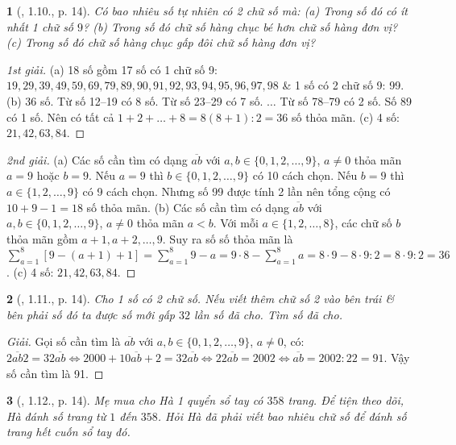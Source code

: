 \documentclass{article}
\newtheorem{baitoan}{}
\begin{document}
\begin{baitoan}[\cite{Binh_boi_duong_Toan_6_tap_1}, 1.10., p. 14]
	Có bao nhiêu số tự nhiên có 2 chữ số mà: (a) Trong số đó có ít nhất 1 chữ số $9$? (b) Trong số đó chữ số hàng chục bé hơn chữ số hàng đơn vị? (c) Trong số đó chữ số hàng chục gấp đôi chữ số hàng đơn vị?
\end{baitoan}

\begin{proof}[1st giải]
	(a) 18 số gồm 17 số có 1 chữ số 9: $19,29,39,49,59,69,79,89,90,91,92,93,94,95,96,97,98$ \& 1 số có 2 chữ số 9: 99. (b) 36 số. Từ số 12--19 có 8 số. Từ số 23--29 có 7 số. $\ldots$ Từ số 78--79 có 2 số. Số 89 có 1 số. Nên có tất cả $1 + 2 + \ldots + 8 = 8(8 + 1):2 = 36$ số thỏa mãn. (c) 4 số: $21,42,63,84$.
\end{proof}

\begin{proof}[2nd giải]
	(a) Các số cần tìm có dạng $\overline{ab}$ với $a,b\in\{0,1,2,\ldots,9\}$, $a\ne0$ thỏa mãn $a = 9$ hoặc $b = 9$. Nếu $a = 9$ thì $b\in\{0,1,2,\ldots,9\}$ có 10 cách chọn. Nếu $b = 9$ thì $a\in\{1,2,\ldots,9\}$ có 9 cách chọn. Nhưng số 99 được tính 2 lần nên tổng cộng có $10 + 9 - 1 = 18$ số thỏa mãn. (b) Các số cần tìm có dạng $\overline{ab}$ với $a,b\in\{0,1,2,\ldots,9\}$, $a\ne0$ thỏa mãn $a < b$. Với mỗi $a\in\{1,2,\ldots,8\}$, các chữ số $b$ thỏa mãn gồm $a + 1,a + 2,\ldots,9$. Suy ra số số thỏa mãn là $\sum_{a=1}^8 [9 - (a + 1) + 1] = \sum_{a=1}^8 9 - a = 9\cdot8 - \sum_{a=1}^8 a = 8\cdot9 - 8\cdot9:2 = 8\cdot9:2 = 36$. (c) 4 số: $21,42,63,84$.
\end{proof}

\begin{baitoan}[\cite{Binh_boi_duong_Toan_6_tap_1}, 1.11., p. 14]
	Cho 1 số có 2 chữ số. Nếu viết thêm chữ số 2 vào bên trái \& bên phải số đó ta được số mới gấp $32$ lần số đã cho. Tìm số đã cho.
\end{baitoan}

\begin{proof}[Giải]
	Gọi số cần tìm là $\overline{ab}$ với $a,b\in\{0,1,2,\ldots,9\}$, $a\ne0$, có: $\overline{2ab2} = 32\overline{ab}\Leftrightarrow2000 + 10\overline{ab} + 2 = 32\overline{ab}\Leftrightarrow22\overline{ab} = 2002\Leftrightarrow\overline{ab} = 2002:22 = 91$. Vậy số cần tìm là 91.
\end{proof}

\begin{baitoan}[\cite{Binh_boi_duong_Toan_6_tap_1}, 1.12., p. 14]
	Mẹ mua cho Hà 1 quyển sổ tay có $358$ trang. Để tiện theo dõi, Hà đánh số trang từ $1$ đến $358$. Hỏi Hà đã phải viết bao nhiêu chữ số để đánh số trang hết cuốn sổ tay đó.
\end{baitoan}
\end{document}
